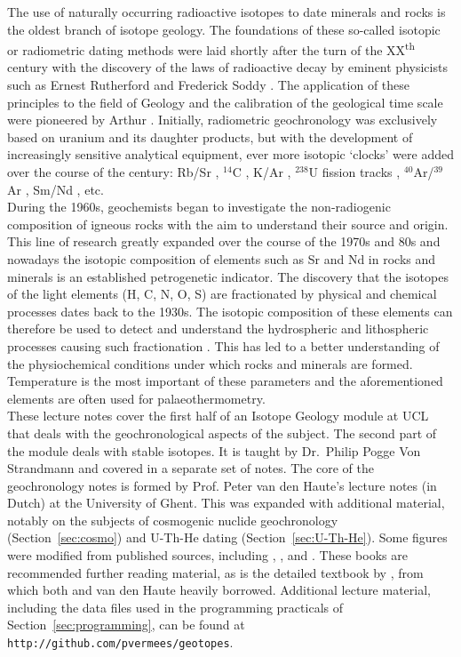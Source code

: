 \documentclass{book}
\begin{document}
The use of naturally occurring radioactive isotopes to date minerals
and rocks is the oldest branch of isotope geology. The foundations of
these so-called isotopic or radiometric dating methods were laid
shortly after the turn of the XX\textsuperscript{th} century with the
discovery of the laws of radioactive decay by eminent physicists such
as Ernest Rutherford and Frederick Soddy \citep{rutherford1902a,
  rutherford1902b}.  The application of these principles to the field
of Geology and the calibration of the geological time scale were
pioneered by Arthur \citet{holmes1911, holmes1913,
  holmes1947}. Initially, radiometric geochronology was exclusively
based on uranium and its daughter products, but with the development
of increasingly sensitive analytical equipment, ever more isotopic
`clocks' were added over the course of the century: Rb/Sr
\citep{hahn1943}, $^{14}$C \citep{libby1946}, K/Ar
\citep{aldrich1948}, $^{238}$U fission tracks \citep{price1963},
$^{40}$Ar/$^{39}$Ar \citep{merrihue1966}, Sm/Nd \citep{lugmair1974},
etc.\\

During the 1960s, geochemists began to investigate the non-radiogenic
composition of igneous rocks with the aim to understand their source
and origin. This line of research greatly expanded over the course of
the 1970s and 80s and nowadays the isotopic composition of elements
such as Sr and Nd in rocks and minerals is an established petrogenetic
indicator. The discovery that the isotopes of the light elements (H,
C, N, O, S) are fractionated by physical and chemical processes dates
back to the 1930s. The isotopic composition of these elements can
therefore be used to detect and understand the hydrospheric and
lithospheric processes causing such fractionation
\citep{urey1947}. This has led to a better understanding of the
physiochemical conditions under which rocks and minerals are
formed. Temperature is the most important of these parameters and the
aforementioned elements are often used for palaeothermometry.\\

These lecture notes cover the first half of an Isotope Geology module
at UCL that deals with the geochronological aspects of the subject.
The second part of the module deals with stable isotopes. It is taught
by Dr.~Philip Pogge Von Strandmann and covered in a separate set of
notes. The core of the geochronology notes is formed by Prof. Peter
van den Haute's lecture notes (in Dutch) at the University of Ghent.
This was expanded with additional material, notably on the subjects of
cosmogenic nuclide geochronology (Section~\ref{sec:cosmo}) and U-Th-He
dating (Section~\ref{sec:U-Th-He}). Some figures were modified from
published sources, including \citet{allegre2008}, \citet{braun2006},
and \citet{galbraith2005}. These books are recommended further reading
material, as is the detailed textbook by \citet{dickin2005}, from
which both \citet{allegre2008} and van den Haute heavily
borrowed. Additional lecture material, including the data files used
in the programming practicals of Section~\ref{sec:programming}, can be
found at \texttt{http://github.com/pvermees/geotopes}.
\end{document}
